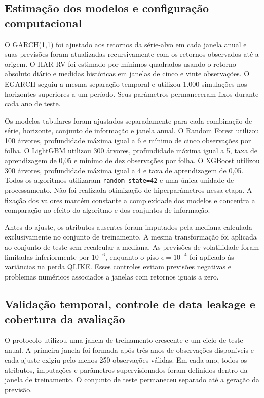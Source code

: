 \documentclass[a4paper,fleqn]{cas-sc}
\begin{document}
\subsection{Estimação dos modelos e configuração computacional}
\label{subsec:experiment_implementation}

O GARCH(1,1) foi ajustado aos retornos da série-alvo em cada janela anual e suas previsões foram atualizadas recursivamente com os retornos observados até a origem. O HAR-RV foi estimado por mínimos quadrados usando o retorno absoluto diário e medidas históricas em janelas de cinco e vinte observações. O EGARCH seguiu a mesma separação temporal e utilizou 1.000 simulações nos horizontes superiores a um período. Seus parâmetros permaneceram fixos durante cada ano de teste.

Os modelos tabulares foram ajustados separadamente para cada combinação de série, horizonte, conjunto de informação e janela anual. O Random Forest utilizou 100 árvores, profundidade máxima igual a 6 e mínimo de cinco observações por folha. O LightGBM utilizou 300 árvores, profundidade máxima igual a 5, taxa de aprendizagem de 0,05 e mínimo de dez observações por folha. O XGBoost utilizou 300 árvores, profundidade máxima igual a 4 e taxa de aprendizagem de 0,05. Todos os algoritmos utilizaram \texttt{random\_state=42} e uma única unidade de processamento. Não foi realizada otimização de hiperparâmetros nessa etapa. A fixação dos valores mantém constante a complexidade dos modelos e concentra a comparação no efeito do algoritmo e dos conjuntos de informação.

Antes do ajuste, os atributos ausentes foram imputados pela mediana calculada exclusivamente no conjunto de treinamento. A mesma transformação foi aplicada ao conjunto de teste sem recalcular a mediana. As previsões de volatilidade foram limitadas inferiormente por \(10^{-6}\), enquanto o piso \(\epsilon=10^{-4}\) foi aplicado às variâncias na perda QLIKE. Esses controles evitam previsões negativas e problemas numéricos associados a janelas com retornos iguais a zero.

\subsection{Validação temporal, controle de data leakage e cobertura da avaliação}
\label{subsec:experimental_validation}

O protocolo utilizou uma janela de treinamento crescente e um ciclo de teste anual. A primeira janela foi formada após três anos de observações disponíveis e cada ajuste exigiu pelo menos 250 observações válidas. Em cada ano, todos os atributos, imputações e parâmetros supervisionados foram definidos dentro da janela de treinamento. O conjunto de teste permaneceu separado até a geração da previsão.
\end{document}
